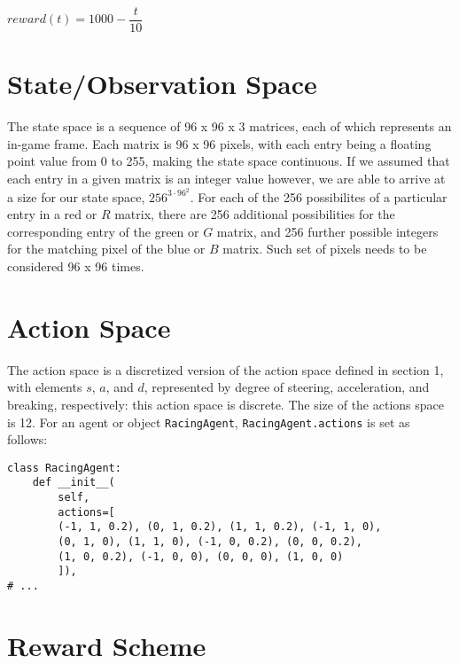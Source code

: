 \documentclass{article}
\begin{document}
\begin{center}
	$ reward(t) = 1000 - \dfrac{t}{10} $
\end{center}


\section{State/Observation Space}

The state space is a sequence of 96 x 96 x 3 matrices, each of which represents an in-game frame. Each matrix is 96 x 96 pixels, with each entry being a floating point value from 0 to 255, making the state space continuous. If we assumed that each entry in a given matrix is an integer value however, we are able to arrive at a size for our state space, $256^{3 \cdot 96^{2}}$. For each of the 256 possibilites of a particular entry in a red or $R$ matrix, there are 256 additional possibilities for the corresponding entry of the green or $G$ matrix, and 256 further possible integers for the matching pixel of the blue or $B$ matrix. Such set of pixels needs to be considered 96 x 96 times. 


\section{Action Space}

The action space is a discretized version of the action space defined in section 1, with elements $s$, $a$, and $d$, represented by degree of steering, acceleration, and breaking, respectively: this action space is discrete. The size of the actions space is 12. For an agent or object \verb|RacingAgent|, \verb|RacingAgent.actions| is set as follows:

\begin{lstlisting}
class RacingAgent:
	def __init__(
		self,
		actions=[
		(-1, 1, 0.2), (0, 1, 0.2), (1, 1, 0.2), (-1, 1, 0),
		(0, 1, 0), (1, 1, 0), (-1, 0, 0.2), (0, 0, 0.2),
		(1, 0, 0.2), (-1, 0, 0), (0, 0, 0), (1, 0, 0)
		]),
# ...
\end{lstlisting}



\section{Reward Scheme}
\end{document}
